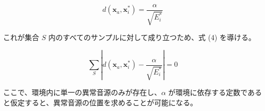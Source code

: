 \documentclass[../main]{subfiles}
\begin{document}
\begin{equation}
    d(\mathbf{x}_a, \mathbf{x}_i^*) = \frac{\alpha}{\sqrt{E_i^*}} \tag{3}
\end{equation}

これが集合 $S$ 内のすべてのサンプルに対して成り立つため、式 (4) を導ける。

\begin{equation}
    \sum_{S} \left| d(\mathbf{x}_a, \mathbf{x}_i^*) - \frac{\alpha}{\sqrt{E_i^*}} \right| = 0 \tag{4}
\end{equation}

ここで、環境内に単一の異常音源のみが存在し、$\alpha$ が環境に依存する定数であると仮定すると、異常音源の位置を求めることが可能になる。
\end{document}
